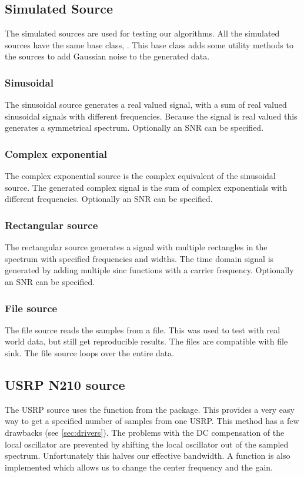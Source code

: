 \documentclass[a4paper, openany, oneside]{memoir}
\begin{document}
\subsection{Simulated Source}
\label{sec:simulated-source}
The simulated sources are used for testing our algorithms. All the simulated sources have the same base class, . This base class adds some utility methods to the sources to add Gaussian noise to the generated data.

\subsubsection{Sinusoidal}
The sinusoidal source generates a real valued signal, with a sum of real valued sinusoidal signals with different frequencies. Because the signal is real valued this generates a symmetrical spectrum. Optionally an SNR can be specified.

\subsubsection{Complex exponential}
The complex exponential source is the complex equivalent of the sinusoidal source. The generated complex signal is the sum of complex exponentials with different frequencies. Optionally an SNR can be specified.

\subsubsection{Rectangular source}
The rectangular source generates a signal with multiple rectangles in the spectrum with specified frequencies and widths. The time domain signal is generated by adding multiple sinc functions with a carrier frequency. Optionally an SNR can be specified.

\subsubsection{File source}
The file source reads the samples from a file. This was used to test with real world data, but still get reproducible results. The files are compatible with  file sink. The file source loops over the entire data.

\subsection{USRP N210 source}
The USRP source uses the  function from the  package. This provides a very easy way to get a specified number of samples from one USRP. This method has a few drawbacks (see \cref{sec:drivers}). The problems with the DC compensation of the local oscillator are prevented by shifting the local oscillator out of the sampled spectrum. Unfortunately this halves our effective bandwidth. A function is also implemented which allows us to change the center frequency and the gain.
\end{document}
